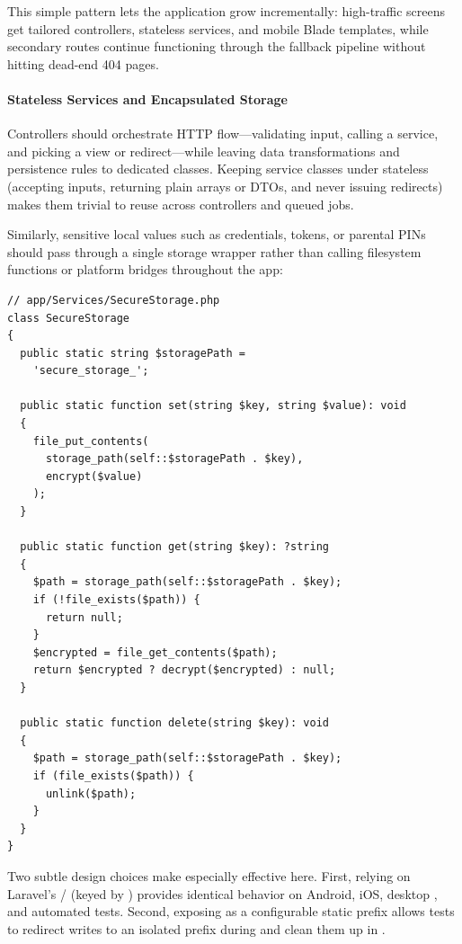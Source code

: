 \noindent This simple pattern lets the application grow incrementally: high-traffic screens get
tailored controllers, stateless services, and mobile Blade templates, while secondary routes
continue functioning through the fallback pipeline without hitting dead-end 404 pages.

\paragraph{Stateless Services and Encapsulated Storage}
Controllers should orchestrate HTTP flow---validating input, calling a service, and picking a
view or redirect---while leaving data transformations and persistence rules to dedicated
classes. Keeping service classes under  stateless (accepting inputs, returning
plain arrays or DTOs, and never issuing redirects) makes them trivial to reuse across
controllers and queued jobs.

Similarly, sensitive local values such as credentials, tokens, or parental PINs should pass
through a single storage wrapper rather than calling filesystem functions or platform bridges
throughout the app:

\begin{lstlisting}[language=php8]
// app/Services/SecureStorage.php
class SecureStorage
{
  public static string $storagePath =
    'secure_storage_';

  public static function set(string $key, string $value): void
  {
    file_put_contents(
      storage_path(self::$storagePath . $key),
      encrypt($value)
    );
  }

  public static function get(string $key): ?string
  {
    $path = storage_path(self::$storagePath . $key);
    if (!file_exists($path)) {
      return null;
    }
    $encrypted = file_get_contents($path);
    return $encrypted ? decrypt($encrypted) : null;
  }

  public static function delete(string $key): void
  {
    $path = storage_path(self::$storagePath . $key);
    if (file_exists($path)) {
      unlink($path);
    }
  }
}
\end{lstlisting}

\noindent Two subtle design choices make  especially effective here. First,
relying on Laravel's / (keyed by ) provides identical
behavior on Android, iOS, desktop , and automated tests. Second, exposing
 as a configurable static prefix allows tests to redirect writes to an isolated
prefix during  and clean them up in .


